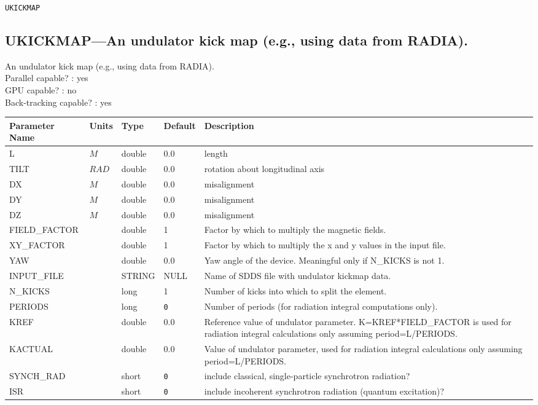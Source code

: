 \newpage
\begin{center}{\Large\verb|UKICKMAP|}\end{center}
\subsection{UKICKMAP---An undulator kick map (e.g., using data from RADIA).}
An undulator kick map (e.g., using data from RADIA).
\\
Parallel capable? : yes\\
GPU capable? : no\\
Back-tracking capable? : yes\\
\begin{tabular}{|l|l|l|l|p{\descwidth}|} \hline
Parameter Name & Units & Type & Default & Description \\ \hline 
L & $M$ & double &  0.0 & length  \\ \hline 
TILT & $RAD$ & double &  0.0 & rotation about longitudinal axis  \\ \hline 
DX & $M$ & double &  0.0 & misalignment  \\ \hline 
DY & $M$ & double &  0.0 & misalignment  \\ \hline 
DZ & $M$ & double &  0.0 & misalignment  \\ \hline 
FIELD\_FACTOR &  & double &   1 & Factor by which to multiply the magnetic fields.  \\ \hline 
XY\_FACTOR &  & double &   1 & Factor by which to multiply the x and y values in the input file.  \\ \hline 
YAW &  & double &  0.0 & Yaw angle of the device. Meaningful only if N\_KICKS is not 1.  \\ \hline 
INPUT\_FILE & $ $ & STRING &   NULL            & Name of SDDS file with undulator kickmap data.  \\ \hline 
N\_KICKS &  & long &   1               & Number of kicks into which to split the element.  \\ \hline 
PERIODS &  & long &  \verb|0| & Number of periods (for radiation integral computations only).  \\ \hline 
KREF &  & double &  0.0 & Reference value of undulator parameter. K=KREF*FIELD\_FACTOR is used for radiation integral calculations only assuming period=L/PERIODS.  \\ \hline 
KACTUAL &  & double &  0.0 & Value of undulator parameter, used for radiation integral calculations only assuming period=L/PERIODS.  \\ \hline 
SYNCH\_RAD &  & short &  \verb|0| & include classical, single-particle synchrotron radiation?  \\ \hline 
ISR &  & short &  \verb|0| & include incoherent synchrotron radiation (quantum excitation)?  \\ \hline 
\end{tabular}

